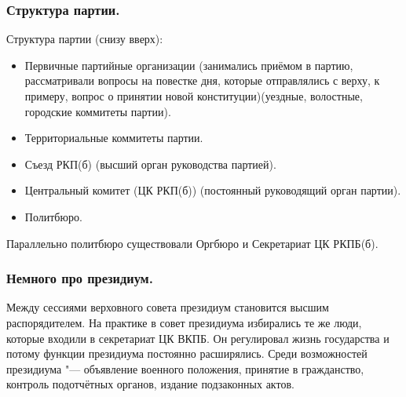 \subsubsection{\textbf{Структура партии.}}

Структура партии (снизу вверх):

\begin{itemize}
    \item Первичные партийные организации (занимались приёмом в партию, рассматривали вопросы на повестке дня, которые отправлялись с верху, к примеру, вопрос о принятии новой конституции)(уездные, волостные, городские коммитеты партии).
    \item Территориальные коммитеты партии.
    \item Съезд РКП(б) (высший орган руководства партией). 
    \item Центральный комитет (ЦК РКП(б)) (постоянный руководящий орган партии).
    \item Политбюро.
\end{itemize}

Параллельно политбюро существовали Оргбюро и Секретариат ЦК РКПБ(б).

\subsubsection{\textbf{Немного про президиум.}}

Между сессиями верховного совета президиум становится высшим распорядителем. На практике в совет президиума избирались те же люди, которые входили в секретариат ЦК ВКПБ. Он регулировал жизнь государства и потому функции президиума постоянно расширялись. Среди возможностей президиума "--- объявление военного положения, принятие в гражданство, контроль подотчётных органов, издание подзаконных актов.